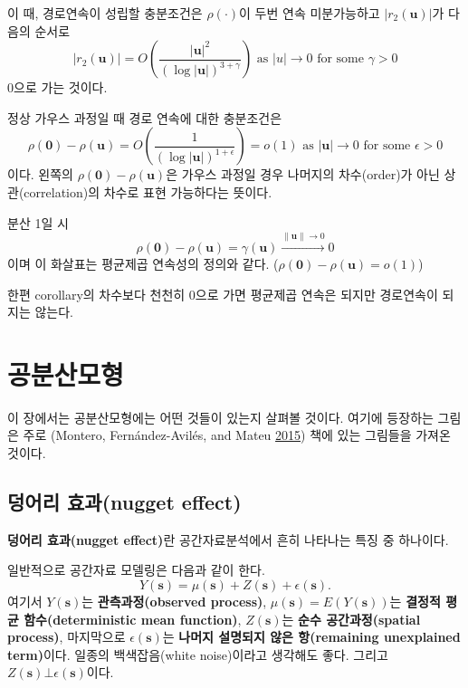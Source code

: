 \documentclass[b5paper,]{book}
\theoremstyle{definition}
\theoremstyle{definition}
\theoremstyle{definition}
\theoremstyle{remark}
\let\BeginKnitrBlock\begin \let\EndKnitrBlock\end
\begin{document}
이 때, 경로연속이 성립할 충분조건은 \(\rho (\cdot)\)이 두번 연속
미분가능하고 \(|r_{2}(\mathbf{u})|\)가 다음의 순서로
\[|r_{2}(\mathbf{u})|=O(\frac{|\mathbf{u}|^{2}}{(\log |\mathbf{u}|)^{3+\gamma}}) \text{ as } |u| \rightarrow 0 \text{ for some } \gamma >0\]
0으로 가는 것이다.

\BeginKnitrBlock{corollary}
\protect\hypertarget{cor:unnamed-chunk-184}{}{\label{cor:unnamed-chunk-184}
}정상 가우스 과정일 때 경로 연속에 대한 충분조건은
\[\rho(\mathbf{0})-\rho(\mathbf{u})=O(\frac{1}{(\log |\mathbf{u}|)^{1+\epsilon}})=o(1) \text{ as } |\mathbf{u}| \rightarrow 0 \text{ for some } \epsilon > 0\]
이다. 왼쪽의 \(\rho(\mathbf{0})-\rho(\mathbf{u})\)은 가우스 과정일 경우
나머지의 차수(order)가 아닌 상관(correlation)의 차수로 표현 가능하다는
뜻이다.
\EndKnitrBlock{corollary}

분산 1일 시
\[\rho(\mathbf{0})-\rho(\mathbf{u})=\gamma(\mathbf{u}) \stackrel{\|\mathbf{u}\| \rightarrow 0}{\rightarrow} 0\]
이며 이 화살표는 평균제곱 연속성의 정의와 같다.
(\(\rho(\mathbf{0})-\rho(\mathbf{u})=o(1)\))

한편 corollary의 차수보다 천천히 0으로 가면 평균제곱 연속은 되지만
경로연속이 되지는 않는다.

\chapter{공분산모형}\label{covmodel}

이 장에서는 공분산모형에는 어떤 것들이 있는지 살펴볼 것이다. 여기에
등장하는 그림은 주로 (Montero, Fernández-Avilés, and Mateu
\protect\hyperlink{ref-Montero2015}{2015}) 책에 있는 그림들을 가져온
것이다.

\section{덩어리 효과(nugget effect)}\label{-nugget-effect}

\textbf{덩어리 효과(nugget effect)}란 공간자료분석에서 흔히 나타나는
특징 중 하나이다.

일반적으로 공간자료 모델링은 다음과 같이 한다.
\[Y(\mathbf{s})=\mu(\mathbf{s})+Z(\mathbf{s})+\epsilon(\mathbf{s}).\]
여기서 \(Y(\mathbf{s})\)는 \textbf{관측과정(observed process)},
\(\mu(\mathbf{s})=E(Y(\mathbf{s}))\)는 \textbf{결정적 평균
함수(deterministic mean function)}, \(Z(\mathbf{s})\)는 \textbf{순수
공간과정(spatial process)}, 마지막으로 \(\epsilon(\mathbf{s})\)는
\textbf{나머지 설명되지 않은 항(remaining unexplained term)}이다. 일종의
백색잡음(white noise)이라고 생각해도 좋다. 그리고
\(Z(\mathbf{s}) \bot \epsilon(\mathbf{s})\)이다.
\end{document}
